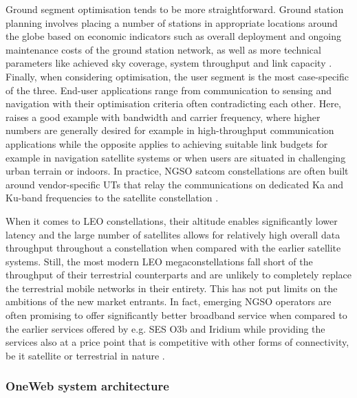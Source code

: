\documentclass[english, 12pt, a4paper, elec, utf8, a-1b, online]{aaltothesis}
\begin{document}
Ground segment optimisation tends to be more straightforward.
Ground station planning involves placing a number of stations in appropriate locations around the globe based on economic indicators such as overall deployment and ongoing maintenance costs of the ground station network, as well as more technical parameters like achieved sky coverage, system throughput and link capacity \cite{celikbilek2022survey}. %
Finally, when considering optimisation, the user segment is the most case-specific of the three.
End-user applications range from communication to sensing and navigation with their optimisation criteria often contradicting each other.
Here, \cite{celikbilek2022survey} raises a good example with bandwidth and carrier frequency, where higher numbers are generally desired for example in high-throughput communication applications while the opposite applies to achieving suitable link budgets for example in navigation satellite systems or when users are situated in challenging urban terrain or indoors.
In practice, NGSO satcom constellations are often built around vendor-specific UTs that relay the communications on dedicated Ka and Ku-band frequencies to the satellite constellation \cite{euspa-secure-satcom-2023}.

When it comes to LEO constellations, their altitude enables significantly lower latency and the large number of satellites allows for relatively high overall data throughput throughout a constellation when compared with the earlier satellite systems.
Still, the most modern LEO megaconstellations fall short of the throughput of their terrestrial counterparts and are unlikely to completely replace the terrestrial mobile networks in their entirety.
This has not put limits on the ambitions of the new market entrants. In fact, emerging NGSO operators are often promising to offer significantly better broadband service when compared to the earlier services offered by e.g. SES O3b and Iridium while providing the services also at a price point that is competitive with other forms of connectivity, be it satellite or terrestrial in nature \cite{euspa-secure-satcom-2023}.

\subsubsection{OneWeb system architecture} \label{ch-oneweb}
\end{document}
